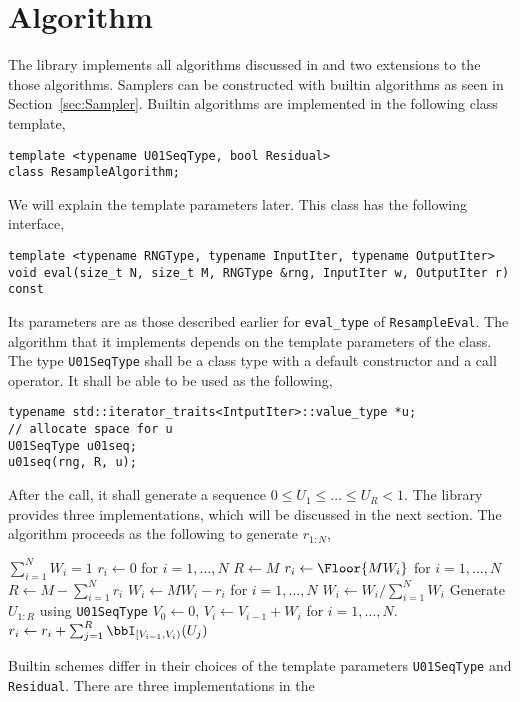 \section{Algorithm}
\label{sec:Algorithm}

The library implements all algorithms discussed in \cite{Douc:2005wa} and two
extensions to the those algorithms. Samplers can be constructed with builtin
algorithms as seen in Section~\ref{sec:Sampler}. Builtin algorithms are
implemented in the following class template,
\begin{Verbatim}
template <typename U01SeqType, bool Residual>
class ResampleAlgorithm;
\end{Verbatim}
We will explain the template parameters later. This class has the following
interface,
\begin{Verbatim}
template <typename RNGType, typename InputIter, typename OutputIter>
void eval(size_t N, size_t M, RNGType &rng, InputIter w, OutputIter r) const
\end{Verbatim}
Its parameters are as those described earlier for \verb|eval_type| of
\verb|ResampleEval|. The algorithm that it implements depends on the template
parameters of the class. The type \verb|U01SeqType| shall be a class type with
a default constructor and a call operator. It shall be able to be used as the
following,
\begin{Verbatim}
typename std::iterator_traits<IntputIter>::value_type *u;
// allocate space for u
U01SeqType u01seq;
u01seq(rng, R, u);
\end{Verbatim}
After the call, it shall generate a sequence $0 \le U_1 \le \dots\le U_R < 1$.
The library provides three implementations, which will be discussed in the next
section. The algorithm proceeds as the following to generate $r_{1:N}$,
\begin{algorithmic}
  \REQUIRE $\sum_{i=1}^N W_i = 1$
  \STATE $r_i \leftarrow 0$ for $i = 1,\dots,N$
  \STATE $R \leftarrow M$
  \ELSE
  \STATE $r_i \leftarrow \Floor{MW_i}$ for $i = 1,\dots,N$
  \STATE $R \leftarrow M - \sum_{i=1}^N r_i$
  \STATE $W_i \leftarrow MW_i - r_i$ for $i = 1,\dots,N$
  \STATE $W_i \leftarrow W_i / \sum_{i=1}^NW_i$
  \ENDIF
  \STATE Generate $U_{1:R}$ using \verb|U01SeqType|
  \STATE $V_0 \leftarrow 0$, $V_i \leftarrow V_{i - 1} + W_i$ for $i =
  1,\dots,N$.
  \STATE $r_i \leftarrow r_i + \sum_{j=1}^R\bbI_{[V_{i-1},V_i)}(U_j)$
\end{algorithmic}
Builtin schemes differ in their choices of the template parameters
\verb|U01SeqType| and \verb|Residual|. There are three implementations in the
